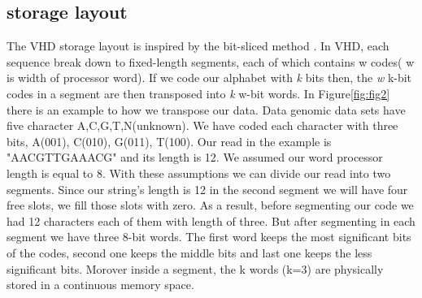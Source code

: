  \subsection{storage layout}
The VHD storage layout is inspired by the bit-sliced method \cite{O_Neil_1997}. In VHD, each sequence break down to fixed-length segments, each of which contains w codes( w is width of processor word). If we code our alphabet with \emph{k} bits then, the \emph{w} k-bit codes in a segment are then transposed into \emph{k} w-bit words. In Figure\ref{fig:fig2} there is an example to how we transpose our data. Data genomic data sets have five character A,C,G,T,N(unknown). We have coded each character with three bits, A(001), C(010), G(011), T(100). Our read in the example is "AACGTTGAAACG" and its length is 12. We assumed our word processor length is equal to 8. With these assumptions we can divide our read into two segments. Since our string's length is 12 in the second segment we will have four free slots, we fill those slots with zero. As a result, before segmenting our code we had 12 characters each of them with length of three. But after segmenting in each segment we have three 8-bit words. The first word keeps the most significant bits of the codes, second one keeps the middle bits and last one keeps the less significant bits. Morover inside a segment, the k words (k=3) are physically stored in a continuous memory space.
 
  
  
  
  
  
  
  
  